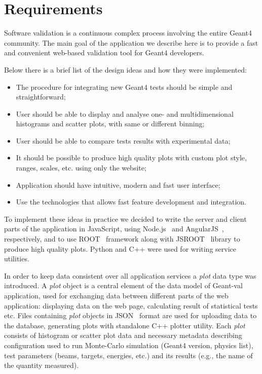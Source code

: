 \section{Requirements}
\label{sec:requirements}

Software validation is a continuous complex process involving the entire Geant4 community. The main goal of the application we describe here is to provide a fast and convenient web-based validation tool for Geant4 developers.

Below there is a brief list of the design ideas
and how they were implemented:
\begin{itemize}
    \item The procedure for integrating new Geant4 tests should be simple and straightforward;
    \item User should be able to display and analyse one- and multidimensional histograms and scatter plots, with same or different binning;
    \item User should be able to compare tests results with experimental data;
    \item It should be possible to produce high quality plots with custom plot style, ranges, scales, etc. using only the website;
    \item Application should have intuitive, modern and fast user interface;
    \item Use the technologies that allows fast feature development and integration.
\end{itemize}

To implement these ideas in practice we decided to write the server and client parts of the application in JavaScript, using Node.js~\cite{NodeJS} and AngularJS~\cite{AngularJS}, respectively, and to use ROOT~\cite{ROOT} framework along with JSROOT~\cite{JSROOT} library to produce high quality plots. Python and C++ were used for writing service utilities.

In order to keep data consistent over all application services a \textit{plot} data type was introduced. A \textit{plot} object is a central element of the data model of \textsf{Geant-val} application, used for exchanging data between different parts of the web application: displaying data on the web page, calculating result of statistical tests etc. Files containing \textit{plot} objects in JSON~\cite{json} format are used for uploading data to the database, generating plots with standalone C++ plotter utility. 
Each \textit{plot} consists of histogram or scatter plot data and necessary metadata describing configuration used to run Monte-Carlo simulation (Geant4 version, physics list), test parameters (beams, targets, energies, etc.) and its results (e.g., the name of the quantity measured).

